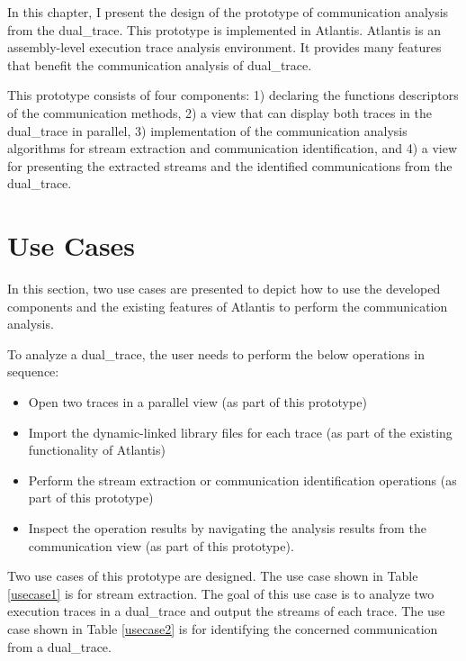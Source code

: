 

\label{chapter:newsol}
In this chapter, I present the design of the prototype of communication analysis from the dual\_trace. This prototype is implemented in Atlantis. Atlantis is an assembly-level execution trace analysis environment. It provides many features that benefit the communication analysis of dual\_trace. 

This prototype consists of four components: 1) declaring the functions descriptors of the communication methods, 2) a view that can display both traces in the dual\_trace in parallel, 3) implementation of the communication analysis algorithms for stream extraction and communication identification, and 4) a view for presenting the extracted streams and the identified communications from the dual\_trace.

\section{Use Cases}
In this section, two use cases are presented to depict how to use the developed components and the existing features of Atlantis to perform the communication analysis.

To analyze a dual\_trace, the user needs to perform the below operations in sequence:
\begin{itemize}
\item Open two traces in a parallel view (as part of this prototype)
\item Import the dynamic-linked library files for each trace (as part of the existing functionality of Atlantis)
\item Perform the stream extraction or communication identification operations (as part of this prototype)
\item Inspect the operation results by navigating the analysis results from the communication view (as part of this prototype).
\end{itemize}

Two use cases of this prototype are designed. The use case shown in Table \ref{usecase1} is for stream extraction. The goal of this use case is to analyze two execution traces in a dual\_trace and output the streams of each trace. The use case shown in Table \ref{usecase2} is for identifying the concerned communication from a dual\_trace. 

